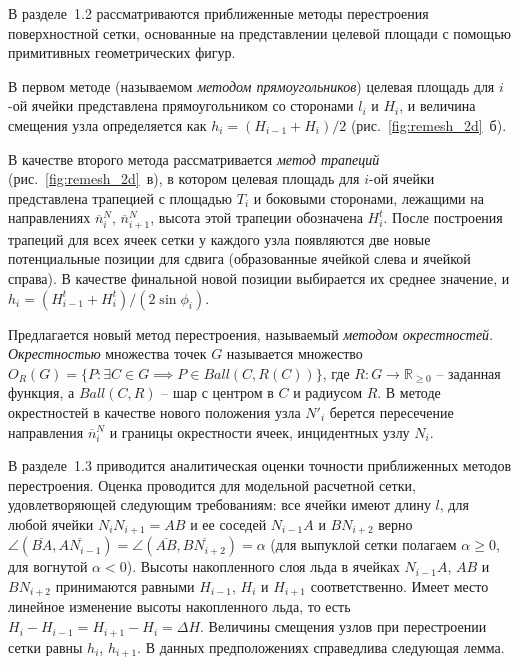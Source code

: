 \documentclass[a4paper,14pt]{extarticle}                     %
\theoremstyle{plain}                                         %
\begin{document}

В разделе~1.2 рассматриваются приближенные методы перестроения поверхностной сетки, основанные на представлении целевой площади с помощью примитивных геометрических фигур.

В первом методе (называемом \textit{методом прямоугольников}) целевая площадь для $i$-ой ячейки представлена прямоугольником со сторонами $l_i$ и $H_i$, и величина смещения узла определяется как $h_i = (H_{i - 1} + H_i)/2$ (рис.~\ref{fig:remesh_2d}~б).

В качестве второго метода рассматривается \textit{метод трапеций} (рис.~\ref{fig:remesh_2d}~в), в котором целевая площадь для $i$-ой ячейки представлена трапецией с площадью $T_i$ и боковыми сторонами, лежащими на направлениях $\overline{n}_i^N$, $\overline{n}_{i + 1}^N$, высота этой трапеции обозначена $H_i^t$.
После построения трапеций для всех ячеек сетки у каждого узла появляются две новые потенциальные позиции для сдвига (образованные ячейкой слева и ячейкой справа).
В качестве финальной новой позиции выбирается их среднее значение, и $h_i = (H_{i - 1}^t + H_i^t) / (2 \sin \phi_i)$.

Предлагается новый метод перестроения, называемый \textit{методом окрестностей}.
\textit{Окрестностью} множества точек $G$ называется множество $O_R(G) = \{ P: \exists C \in G \implies P \in Ball(C, R(C)) \}$, где $R: G \rightarrow \mathbb{R}_{\ge 0}$ -- заданная функция, а $Ball(C, R)$ -- шар с центром в $C$ и радиусом $R$.
В методе окрестностей в качестве нового положения узла $N'_i$ берется пересечение направления $\overline{n}_i^N$ и границы окрестности ячеек, инцидентных узлу $N_i$.


В разделе~1.3 приводится аналитическая оценки точности приближенных методов перестроения.
Оценка проводится для модельной расчетной сетки, удовлетворяющей следующим требованиям: все ячейки имеют длину $l$, для любой ячейки $N_iN_{i + 1} = AB$ и ее соседей $N_{i - 1}A$ и $BN_{i + 2}$ верно $\angle (\overline{BA}, \overline{AN_{i - 1}}) = \angle (\overline{AB}, \overline{BN_{i + 2}}) = \alpha$ (для выпуклой сетки полагаем $\alpha \ge 0$, для вогнутой $\alpha < 0$).
Высоты накопленного слоя льда в ячейках $N_{i - 1}A$, $AB$ и $BN_{i + 2}$ принимаются равными $H_{i - 1}$, $H_i$ и $H_{i + 1}$ соответственно.
Имеет место линейное изменение высоты накопленного льда, то есть $H_i - H_{i - 1} = H_{i + 1} - H_i = \Delta H$.
Величины смещения узлов при перестроении сетки равны $h_i$, $h_{i + 1}$.
В данных предположениях справедлива следующая лемма.
\end{document}
